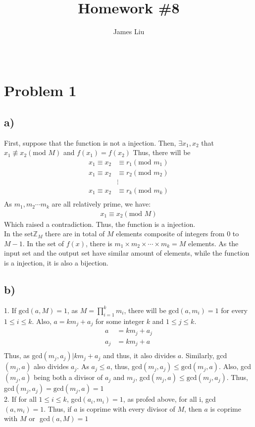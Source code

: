 \documentclass{article}
\title{\textbf{Homework \#8 }}
\author{James Liu}
\date{\ }
\begin{document}
\maketitle
\section*{Problem 1}
\subsection*{a)}
First, suppose that the function is not a injection. Then, \(\exists x_1,x_2\) that\\ \(x_1\not\equiv x_2 (\text{mod }M)\) and  \(f(x_1)=f(x_2)\) 
Thus, there will be 
\begin{align*}
    x_1\equiv x_2 &\equiv r_1 (\text{mod }m_1)\\
    x_1\equiv x_2 &\equiv r_2 (\text{mod }m_2)\\
    &\vdots\\
    x_1\equiv x_2 &\equiv r_k (\text{mod }m_k)\\
\end{align*}
As \(m_1,m_2\cdots m_k\) are all relatively prime, we have:
\begin{align*}
    x_1\equiv x_2 (\text{mod }M)
\end{align*}
Which raised a contradiction. Thus, the function is a injection.\\
In the set\(\mathbb{Z}_M\) there are in total of \(M\) elements composite of integers from \(0\) to \(M-1\). In the set of \(f(x)\),
there is \(m_1\times m_2\times \cdots \times m_k=M\) elements. As the input set and the output set have similar amount of elements, while 
the function is a injection, it is also a bijection.
\subsection*{b)}
1. If \(\text{gcd}(a,M)=1\), as \(M = \prod_{i=1}^k m_i \), there will be \(\text{gcd}(a,m_i)=1\) for every \(1\leqslant i \leqslant k\).
Also, \(a=km_j+a_j\) for some integer \(k\) and \(1\leqslant j \leqslant k\).
\begin{align*}
    a&=km_j+a_j\\
    a_j&=km_j+a\\
\end{align*}
Thus, as gcd\((m_j,a_j)|km_j+a_j\) and thus, it also divides \(a\). Similarly, gcd\((m_j,a)\) also divides \(a_j\).
As \(a_j\leqslant a\), thus, gcd\((m_j,a_j)\leqslant \text{gcd}(m_j,a)\). Also, gcd\((m_j,a)\) being both a divisor of 
\(a_j\) and \(m_j\), gcd\((m_j,a)\leqslant \text{gcd}(m_j,a_j)\). Thus, gcd\((m_j,a_j)= \text{gcd}(m_j,a)=1\)
\\2. If for all \(1\leqslant i \leqslant k\), gcd\((a_i,m_i)=1\), as profed above, for all i, 
gcd\((a,m_i)=1\). Thus, if \(a\) is coprime with every divisor of \(M\), then \(a\) is coprime with \(M\) or \(\)
gcd\((a,M)=1\)
\end{document}
